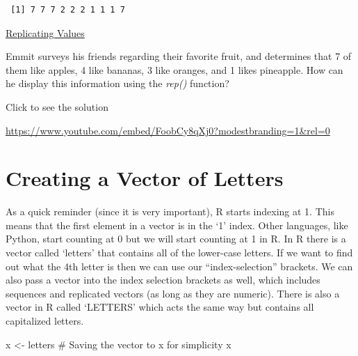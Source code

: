 \documentclass[
  letterpaper,
  DIV=11,
  numbers=noendperiod]{scrreprt}
\newenvironment{Shaded}{\begin{snugshade}}{\end{snugshade}}
\newcommand{\CommentTok}[1]{\textcolor[rgb]{0.37,0.37,0.37}{#1}}
\newcommand{\NormalTok}[1]{\textcolor[rgb]{0.00,0.23,0.31}{#1}}
\newcommand{\OtherTok}[1]{\textcolor[rgb]{0.00,0.23,0.31}{#1}}
\begin{document}
\begin{verbatim}
 [1] 7 7 7 2 2 2 1 1 1 7
\end{verbatim}

\begin{watch}{}{}
    \href{https://youtu.be/OGBhjbDChgQ}{Replicating Values}
\end{watch}

\begin{tcolorbox}[enhanced jigsaw, leftrule=.75mm, arc=.35mm, coltitle=black, rightrule=.15mm, bottomrule=.15mm, toprule=.15mm, left=2mm, colbacktitle=quarto-callout-tip-color!10!white, title=\textcolor{quarto-callout-tip-color}{\faLightbulb}\hspace{0.5em}{Try it Out}, toptitle=1mm, breakable, colframe=quarto-callout-tip-color-frame, bottomtitle=1mm, titlerule=0mm, colback=white, opacityback=0, opacitybacktitle=0.6]

Emmit surveys his friends regarding their favorite fruit, and determines
that 7 of them like apples, 4 like bananas, 3 like oranges, and 1 likes
pineapple. How can he display this information using the \emph{rep()}
function?

Click to see the solution

\url{https://www.youtube.com/embed/FoobCy8qXj0?modestbranding=1&rel=0}

\end{tcolorbox}

\section{Creating a Vector of
Letters}\label{creating-a-vector-of-letters}

As a quick reminder (since it is very important), R starts indexing at
1. This means that the first element in a vector is in the `1' index.
Other languages, like Python, start counting at 0 but we will start
counting at 1 in R. In R there is a vector called `letters' that
contains all of the lower-case letters. If we want to find out what the
4th letter is then we can use our ``index-selection'' brackets. We can
also pass a vector into the index selection brackets as well, which
includes sequences and replicated vectors (as long as they are numeric).
There is also a vector in R called `LETTERS' which acts the same way but
contains all capitalized letters.

\begin{Shaded}
\begin{Highlighting}[]
\NormalTok{x }\OtherTok{\textless{}{-}}\NormalTok{ letters }\CommentTok{\# Saving the vector to \textquotesingle{}x\textquotesingle{} for simplicity}
\NormalTok{x}
\end{Highlighting}
\end{Shaded}
\end{document}
